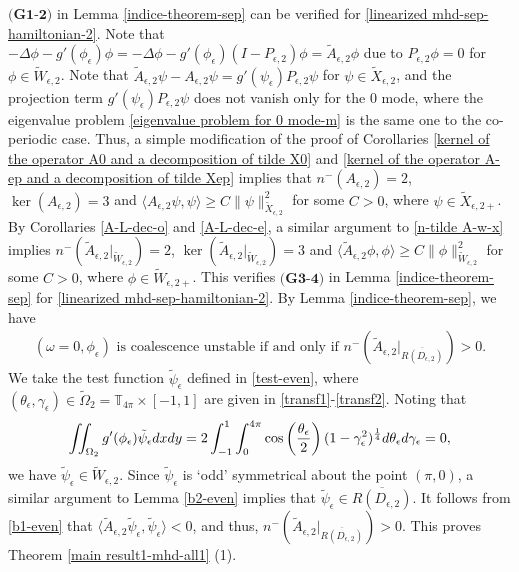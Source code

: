 \documentclass[1 [leqno, 11pt]{amsart}
\numberwithin{equation}{section}
\let\ep=\epsilon
\def\gep{\gamma_\epsilon}
\begin{document}
\begin{CJK*}{GBK}{song}
$\textbf{(G1-2)}$ in Lemma \ref{indice-theorem-sep} can be verified for \eqref{linearized mhd-sep-hamiltonian-2}.
Note that $-\Delta\phi-g'(\phi_{\ep})\phi=-\Delta\phi-g'(\phi_{\ep})(I-P_{\ep,2})\phi=\tilde A_{\ep,2}\phi$ due to $P_{\ep,2}\phi=0$ for $\phi\in \tilde W_{\ep,2}$.
Note that $\tilde A_{\ep,2}\psi-A_{\ep,2}\psi=g'(\psi_\ep)P_{\ep,2}\psi$ for $\psi\in\tilde X_{\ep,2}$, and the projection term $g'(\psi_\ep)P_{\ep,2}\psi$ does not vanish only for the $0$ mode, where the eigenvalue problem \eqref{eigenvalue problem for 0 mode-m} is the same one to the co-periodic case. Thus, a simple modification of the proof of Corollaries \ref{kernel of  the operator A0 and a decomposition of tilde X0} and \ref{kernel of  the operator A-ep and a decomposition of tilde Xep} implies that $n^-( A_{\ep,2})=2$, $\ker( A_{\ep,2})=3$ and $\langle  A_{\ep,2}\psi,\psi\rangle\geq C\|\psi\|_{\tilde X_{\ep,2}}^2$ for some $C>0$, where $\psi\in\tilde X_{\ep,2+}$.
\fi
By Corollaries \ref{A-L-dec-o} and \ref{A-L-dec-e}, a similar argument to \eqref{n-tilde A-w-x} implies
$n^-(\tilde A_{\ep,2}|_{\tilde W_{\ep,2}})=2$, $\ker(\tilde A_{\ep,2}|_{\tilde W_{\ep,2}})=3$ and $\langle \tilde A_{\ep,2}\phi,\phi\rangle\geq C\|\phi\|_{\tilde W_{\ep,2}}^2$ for some $C>0$, where $\phi\in\tilde W_{\ep,2+}$.
   This verifies
  $\textbf{(G3-4)}$ in Lemma \ref{indice-theorem-sep} for  \eqref{linearized mhd-sep-hamiltonian-2}.
 By  Lemma \ref{indice-theorem-sep}, we have
 \begin{align}\label{stab-criteria-coalescence-mhd}
 (\omega=0,\phi_{\ep}) \text{ is coalescence unstable if and only if } n^-\left(\tilde A_{\ep,2}|_{\overline{R(D_{\ep,2})}}\right)>0.
 \end{align}
We take the test function $\tilde{\psi}_\ep$ defined in \eqref{test-even}, where $(\theta_\ep, \gep) \in \tilde{\Omega}_{2} = \mathbb{T}_{4\pi} \times [-1, 1]$ are given in \eqref{transf1}-\eqref{transf2}. Noting that
\begin{align*}
\iint_{\Omega_2}g'(\phi_\ep)\tilde{\psi}_\ep dxdy  =2\int_{-1}^1\int_{0}^{4\pi}\cos\left(\frac{\theta_\ep}{2}\right)(1-\gamma_\ep^2)^{1\over4} d\theta_\ep d\gamma_\ep=0,
\end{align*}
we have $\tilde{\psi}_\ep\in\tilde W_{\ep,2}$.
Since $\tilde{\psi}_\ep$ is `odd' symmetrical about the point $(\pi,0)$, a similar argument to Lemma \ref{b2-even} implies that $
\tilde{\psi}_\ep\in \overline{R(D_{\ep,2})}$. It follows from \eqref{b1-even} that $\langle \tilde A_{\ep,2} \tilde{\psi}_\ep,\tilde{\psi}_\ep\rangle<0$, and thus, $n^-\left(\tilde A_{\ep,2}|_{\overline{R(D_{\ep,2})}}\right)>0$. This proves Theorem \ref{main result1-mhd-all1} (1).

\end{CJK*}
\end{document}
